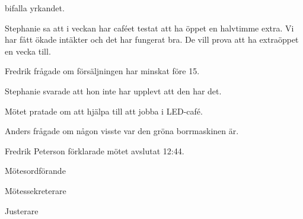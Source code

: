 \documentclass[10pt]{article}
\def\mo{Fredrik Peterson}
\def\ms{Erik Månsson}
\def\ji{Johannes Koch}
\begin{document}
\begin{paragrafer}
\Mba bifalla yrkandet.

Stephanie sa att i veckan har caféet testat att ha öppet en halvtimme extra. Vi har fått ökade intäkter och det har fungerat bra. De vill prova att ha extraöppet en vecka till.

Fredrik frågade om försäljningen har minskat före 15.

Stephanie svarade att hon inte har upplevt att den har det.

Mötet pratade om att hjälpa till att jobba i LED-café.

Anders frågade om någon visste var den gröna borrmaskinen är.

{\mo} förklarade mötet avslutat 12:44.

\end{paragrafer}

\hidesignfoot
\begin{signatures}{3}
\signature{\mo}{Mötesordförande}
\signature{\ms}{Mötessekreterare}
\signature{\ji}{Justerare}
\end{signatures}
\end{document}
